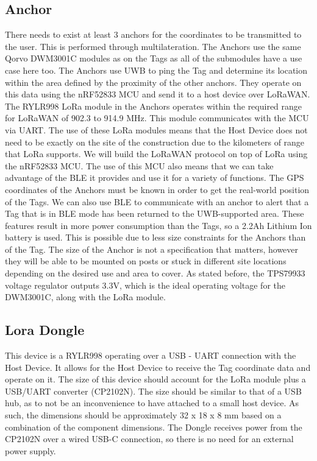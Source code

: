 \documentclass[conference]{IEEEtran}
\begin{document}
\subsection{Anchor}
There needs to exist at least 3 anchors for the coordinates to be transmitted to the user. This is performed through multilateration. The Anchors use the same Qorvo DWM3001C modules as on the Tags as all of the submodules have a use case here too. The Anchors use UWB to ping the Tag and determine its location within the area defined by the proximity of the other anchors. They operate on this data using the nRF52833 MCU and send it to a host device over LoRaWAN. The RYLR998 LoRa module in the Anchors operates within the required range for LoRaWAN of 902.3 to 914.9 MHz. This module communicates with the MCU via UART. The use of these LoRa modules means that the Host Device does not need to be exactly on the site of the construction due to the kilometers of range that LoRa supports. We will build the LoRaWAN protocol on top of LoRa using the nRF52833 MCU. The use of this MCU also means that we can take advantage of the BLE it provides and use it for a variety of functions. The GPS coordinates of the Anchors must be known in order to get the real-world position of the Tags. We can also use BLE to communicate with an anchor to alert that a Tag that is in BLE mode has been returned to the UWB-supported area. These features result in  more power consumption than the Tags, so a 2.2Ah Lithium Ion battery is used. This is possible due to less size constraints for the Anchors than of the Tag. The size of the Anchor is not a specification that matters, however they will be able to be mounted on posts or stuck in different site locations depending on the desired use and area to cover.
As stated before, the TPS79933 voltage regulator outputs 3.3V, which is the ideal operating voltage for the DWM3001C, along with the LoRa module. 


\subsection{Lora Dongle}
This device is a RYLR998 operating over a USB - UART connection with the Host Device. It allows for the Host Device to receive the Tag coordinate data and operate on it. The size of this device should account for the LoRa module plus a USB/UART converter (CP2102N). The size should be similar to that of a USB hub, as to not be an inconvenience to have attached to a small host device. As such, the dimensions should be approximately 32 x 18 x 8 mm based on a combination of the component dimensions. 
The Dongle receives power from the CP2102N over a wired USB-C connection, so there is no need for an external power supply. 
\end{document}
